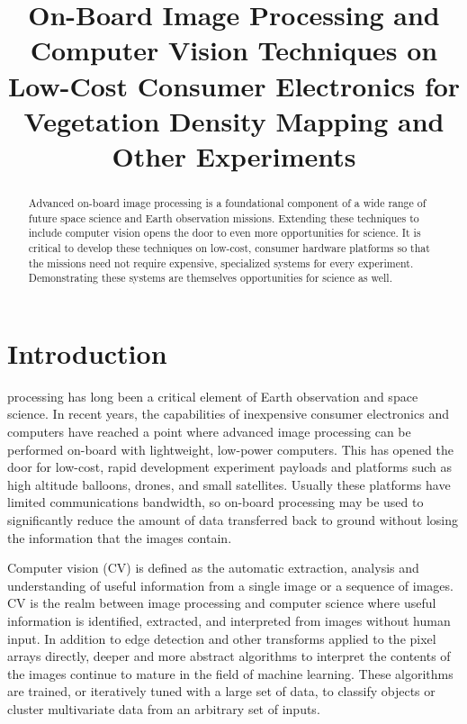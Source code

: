 \documentclass[conference]{IEEEtran} %
\title{On-Board Image Processing and Computer Vision Techniques on Low-Cost Consumer Electronics for Vegetation Density Mapping and Other Experiments}
\author{
   \IEEEauthorblockN{%
    Philip~Linden\IEEEauthorrefmark{1},
    Jeff~Maggio\IEEEauthorrefmark{2},
    T.J.~Tarazevits\IEEEauthorrefmark{3}
  }
  \IEEEauthorblockA{%
    RIT Space Exploration, Rochester Institute of Technology \\ %
    Rochester, N.Y. \\
    Email:
    \IEEEauthorrefmark{1}pjl7651@rit.edu,
    \IEEEauthorrefmark{2}jxm9264.rit.edu,
    \IEEEauthorrefmark{3}tjt3085@rit.edu
  }
}
\begin{document}
\maketitle%

\begin{abstract}
    Advanced on-board image processing is a foundational component of a wide range of future space science and Earth observation missions.
    Extending these techniques to include computer vision opens the door to even more opportunities for science.
    It is critical to develop these techniques on low-cost, consumer hardware platforms so that the missions need not require expensive, specialized systems for every experiment.
    Demonstrating these systems are themselves opportunities for science as well.
\end{abstract}

\section{Introduction}
\label{sec:introduction}

 processing has long been a critical element of Earth observation and space science.
In recent years, the capabilities of inexpensive consumer electronics and computers have reached a point where advanced image processing can be performed on-board with lightweight, low-power computers.
This has opened the door for low-cost, rapid development experiment payloads and platforms such as high altitude balloons, drones, and small satellites.
Usually these platforms have limited communications bandwidth, so on-board processing may be used to significantly reduce the amount of data transferred back to ground without losing the information that the images contain.

Computer vision (CV) is defined as the automatic extraction, analysis and understanding of useful information from a single image or a sequence of images.
CV is the realm between image processing and computer science where useful information is identified, extracted, and interpreted from images without human input.
In addition to edge detection and other transforms applied to the pixel arrays directly, deeper and more abstract algorithms to interpret the contents of the images continue to mature in the field of machine learning.
These algorithms are trained, or iteratively tuned with a large set of data, to classify objects or cluster multivariate data from an arbitrary set of inputs.
\end{document}
